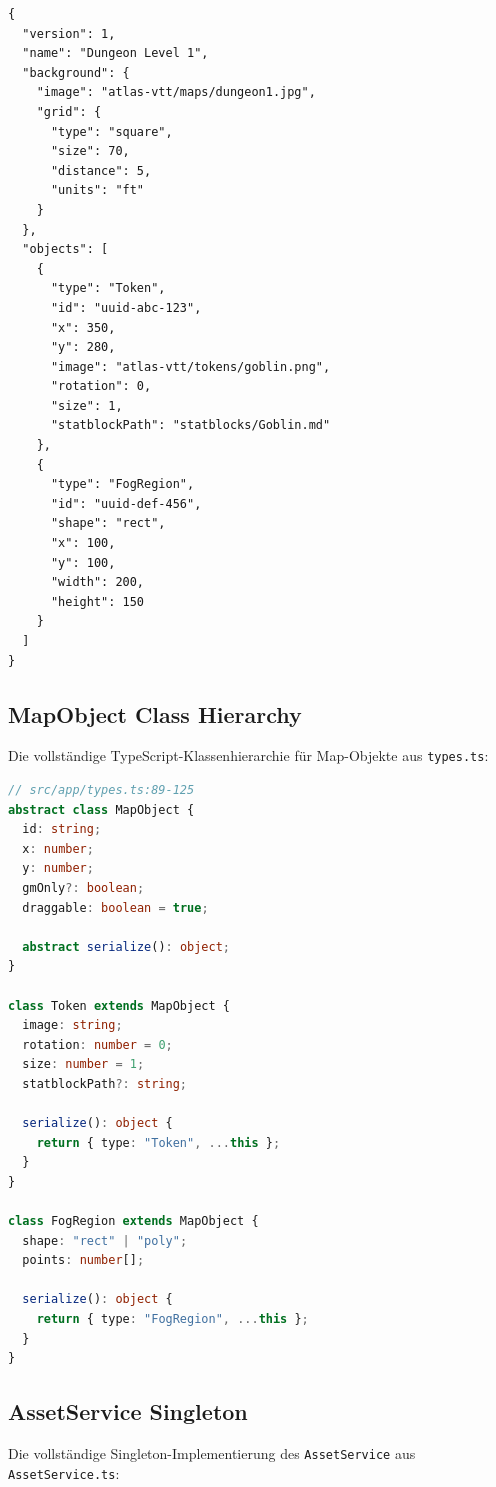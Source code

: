 \begin{lstlisting}[language={},caption={.atlasmap JSON Schema (vollständiges Beispiel)},label=lst:atlasmap-schema-full]
{
  "version": 1,
  "name": "Dungeon Level 1",
  "background": {
    "image": "atlas-vtt/maps/dungeon1.jpg",
    "grid": {
      "type": "square",
      "size": 70,
      "distance": 5,
      "units": "ft"
    }
  },
  "objects": [
    {
      "type": "Token",
      "id": "uuid-abc-123",
      "x": 350,
      "y": 280,
      "image": "atlas-vtt/tokens/goblin.png",
      "rotation": 0,
      "size": 1,
      "statblockPath": "statblocks/Goblin.md"
    },
    {
      "type": "FogRegion",
      "id": "uuid-def-456",
      "shape": "rect",
      "x": 100,
      "y": 100,
      "width": 200,
      "height": 150
    }
  ]
}
\end{lstlisting}

\subsection{MapObject Class Hierarchy}
\label{sec:anhang-mapobject-hierarchy}

Die vollständige TypeScript-Klassenhierarchie für Map-Objekte aus \texttt{types.ts}:

\begin{lstlisting}[language=TypeScript,caption={MapObject Class Hierarchy (vollständige Implementierung)},label=lst:mapobject-hierarchy-full]
// src/app/types.ts:89-125
abstract class MapObject {
  id: string;
  x: number;
  y: number;
  gmOnly?: boolean;
  draggable: boolean = true;

  abstract serialize(): object;
}

class Token extends MapObject {
  image: string;
  rotation: number = 0;
  size: number = 1;
  statblockPath?: string;

  serialize(): object {
    return { type: "Token", ...this };
  }
}

class FogRegion extends MapObject {
  shape: "rect" | "poly";
  points: number[];

  serialize(): object {
    return { type: "FogRegion", ...this };
  }
}
\end{lstlisting}

\subsection{AssetService Singleton}
\label{sec:anhang-asset-service}

Die vollständige Singleton-Implementierung des \texttt{AssetService} aus \texttt{AssetService.ts}:

